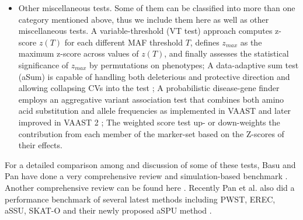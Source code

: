 \documentclass[12pt]{article}
\begin{document}
\begin{itemize}
\item Other miscellaneous tests. Some of them can be classified into more than one category mentioned above, thus we include them here as well as other miscellaneous tests. A variable-threshold (VT test) approach \cite{Price2010} computes z-score $z(T)$ for each different MAF threshold $T$, defines $z_{max}$ as the maximum z-score across values of $z(T)$, and finally assesses the statistical significance of $z_{max}$ by permutations on phenotypes; A data-adaptive sum test (aSum) is capable of handling both deleterious and protective direction and allowing collapsing CVs into the test \cite{Han2010}; A probabilistic disease-gene finder employs an aggregative variant association test that combines both amino acid substitution and allele frequencies as implemented in VAAST \cite{Yandell2011} and later improved in VAAST 2 \cite{Hu2013}; The weighted score test \cite{Cai2012} up- or down-weights the contribution from each member of the marker-set based on the Z-scores of their effects.
\end{itemize}

For a detailed comparison among and discussion of some of these tests, Basu and Pan have done a very comprehensive review and simulation-based benchmark \cite{Basu2011}. Another comprehensive review can be found here \cite{Bansal2010}. Recently Pan et al. also did a performance benchmark of several latest methods including PWST, EREC, aSSU, SKAT-O and their newly proposed aSPU method \cite{pan2014powerful}.
\end{document}
